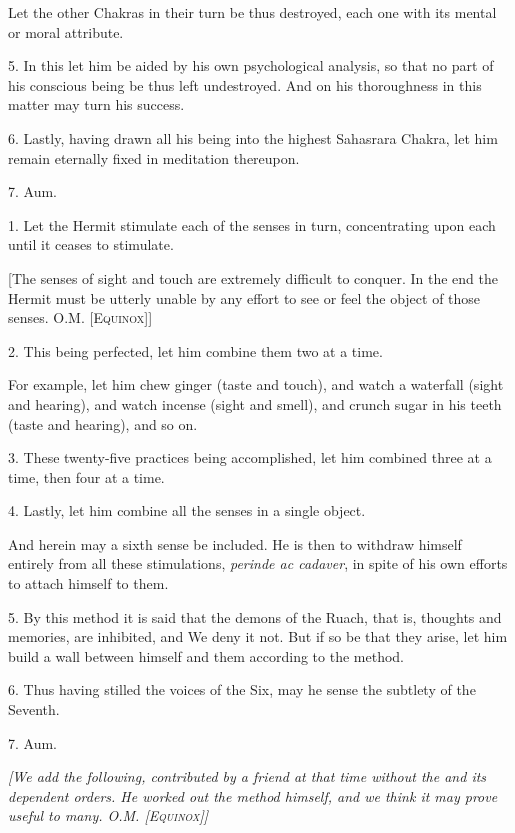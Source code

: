 Let the other Chakras in their turn be thus destroyed, each one with its mental or moral attribute.

5. In this let him be aided by his own psychological analysis, so that no part of his conscious being be thus left undestroyed. And on his thoroughness in this matter may turn his success.

6. Lastly, having drawn all his being into the highest Sahasrara Chakra, let him remain eternally fixed in meditation thereupon.

7. Aum.


1. Let the Hermit stimulate each of the senses in turn, concentrating upon each until it ceases to stimulate.

[The senses of sight and touch are extremely difficult to conquer. In the end the Hermit must be utterly unable by any effort to see or feel the object of those senses. O.M. \textsc{[Equinox]}]

2.  This being perfected, let him combine them two at a time.

For example, let him chew ginger (taste and touch), and watch a waterfall (sight and hearing), and watch incense (sight and smell), and crunch sugar in his teeth (taste and hearing), and so on.

3. These twenty-five practices being accomplished, let him combined three at a time, then four at a time.

4. Lastly, let him combine all the senses in a single object.

And herein may a sixth sense be included. He is then to withdraw himself entirely from all these stimulations, \textit{perinde ac cadaver}, in spite of his own efforts to attach himself to them.

5. By this method it is said that the demons of the Ruach, that is, thoughts and memories, are inhibited, and We deny it not. But if so be that they arise, let him build a wall between himself and them according to the method.

6. Thus having stilled the voices of the Six, may he sense the subtlety of the Seventh.

7. Aum.


\textit{[We add the following, contributed by a friend at that time without the \Argentium{} and its dependent orders. He worked out the method himself, and we think it may prove useful to many. O.M. \textsc{[Equinox]}]}

